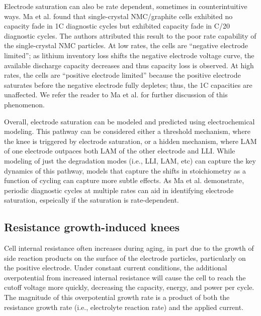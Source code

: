 \documentclass[journal=jpclcd,manuscript=article]{achemso}
\begin{document}
Electrode saturation can also be rate dependent, sometimes in counterintuitive ways. Ma et al.\cite{ma_editors_2019} found that single-crystal NMC/graphite cells exhibited no capacity fade in 1C diagnostic cycles but exhibited capacity fade in C/20 diagnostic cycles. The authors attributed this result to the poor rate capability of the single-crystal NMC particles. At low rates, the cells are ``negative electrode limited''; as lithium inventory loss shifts the negative electrode voltage curve, the available discharge capacity decreases and thus capacity loss is observed. At high rates, the cells are ``positive electrode limited'' because the positive electrode saturates before the negative electrode fully depletes; thus, the 1C capacities are unaffected. We refer the reader to Ma et al.\cite{ma_editors_2019} for further discussion of this phenomenon.

Overall, electrode saturation can be modeled and predicted using electrochemical modeling. This pathway can be considered either a threshold mechanism, where the knee is triggered by electrode saturation, or a hidden mechanism, where LAM of one electrode outpaces both LAM of the other electrode and LLI. While modeling of just the degradation modes (i.e., LLI, LAM, etc) can capture the key dynamics of this pathway, models that capture the shifts in stoichiometry as a function of cycling can capture more subtle effects. As Ma et al.\cite{ma_editors_2019} demonstrate, periodic diagnostic cycles at multiple rates can aid in identifying electrode saturation, espeically if the saturation is rate-dependent.

\subsection{Resistance growth-induced knees}

Cell internal resistance often increases during aging, in part due to the growth of side reaction products on the surface of the electrode particles, particularly on the positive electrode\cite{ma_editors_2019}. Under constant current conditions, the additional overpotential from increased internal resistance will cause the cell to reach the cutoff voltage more quickly, decreasing the capacity, energy, and power per cycle. The magnitude of this overpotential growth rate is a product of both the resistance growth rate (i.e., electrolyte reaction rate) and the applied current.
\end{document}
